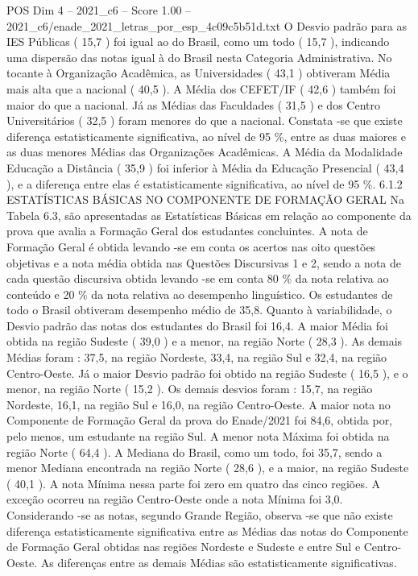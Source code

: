 \begin{textsample}{POS Dim 4 – 2021\_c6 – Score 1.00 – 2021\_c6/enade\_2021\_letras\_por\_esp\_4c09c5b51d.txt}
O Desvio padrão para as IES Públicas ( 15,7 ) foi igual ao do Brasil, como um todo ( 15,7 ), indicando uma dispersão das notas igual à do Brasil nesta Categoria Administrativa.
No tocante à Organização Acadêmica, as Universidades ( 43,1 ) obtiveram Média mais alta que a nacional ( 40,5 ).
A Média dos CEFET/IF ( 42,6 ) também foi maior do que a nacional.
Já as Médias das Faculdades ( 31,5 ) e dos Centro Universitários ( 32,5 ) foram menores do que a nacional.
Constata -se que existe diferença estatisticamente significativa, ao nível de 95 \%, entre as duas maiores e as duas menores Médias das Organizações Acadêmicas.
A Média da Modalidade Educação a Distância ( 35,9 ) foi inferior à Média da Educação Presencial ( 43,4 ), e a diferença entre elas é estatisticamente significativa, ao nível de 95 \%. 6.1.2 ESTATÍSTICAS BÁSICAS NO COMPONENTE DE FORMAÇÃO GERAL Na Tabela 6.3, são apresentadas as Estatísticas Básicas em relação ao componente da prova que avalia a Formação Geral dos estudantes concluintes.
A nota de Formação Geral é obtida levando -se em conta os acertos nas oito questões objetivas e a nota média obtida nas Questões Discursivas 1 e 2, sendo a nota de cada questão discursiva obtida levando -se em conta 80 \% da nota relativa ao conteúdo e 20 \% da nota relativa ao desempenho linguístico.
Os estudantes de todo o Brasil obtiveram desempenho médio de 35,8.
Quanto à variabilidade, o Desvio padrão das notas dos estudantes do Brasil foi 16,4.
A maior Média foi obtida na região Sudeste ( 39,0 ) e a menor, na região Norte ( 28,3 ).
As demais Médias foram : 37,5, na região Nordeste, 33,4, na região Sul e 32,4, na região Centro-Oeste.
Já o maior Desvio padrão foi obtido na região Sudeste ( 16,5 ), e o menor, na região Norte ( 15,2 ).
Os demais desvios foram : 15,7, na região Nordeste, 16,1, na região Sul e 16,0, na região Centro-Oeste.
A maior nota no Componente de Formação Geral da prova do Enade/2021 foi 84,6, obtida por, pelo menos, um estudante na região Sul.
A menor nota Máxima foi obtida na região Norte ( 64,4 ).
A Mediana do Brasil, como um todo, foi 35,7, sendo a menor Mediana encontrada na região Norte ( 28,6 ), e a maior, na região Sudeste ( 40,1 ).
A nota Mínima nessa parte foi zero em quatro das cinco regiões.
A exceção ocorreu na região Centro-Oeste onde a nota Mínima foi 3,0.
Considerando -se as notas, segundo Grande Região, observa -se que não existe diferença estatisticamente significativa entre as Médias das notas do Componente de Formação Geral obtidas nas regiões Nordeste e Sudeste e entre Sul e Centro-Oeste.
As diferenças entre as demais Médias são estatisticamente significativas.

\end{textsample}
